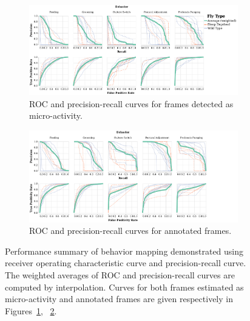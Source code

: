 \begin{figure}[htb!]
	\centering
	\begin{subfigure}[b]{0.99\linewidth}
		\centering\includegraphics[width=\linewidth]{figures/PRC_ROC-DActfiltered.pdf}
		\caption{ROC and precision-recall curves for frames detected as micro-activity. \label{figure:ROC-PRC-Act}}
	\end{subfigure}%

	\begin{subfigure}[b]{0.99\linewidth}
		\centering\includegraphics[width=\linewidth]{figures/PRC_ROC-DAnnfiltered.pdf}
		\caption{ROC and precision-recall curves for annotated frames. \label{figure:ROC-PRC-Ann}}
	\end{subfigure}%
	\caption[Performance summary of behavior mapping demonstrated using receiver operating characteristic curve and precision-recall curve.
	]{Performance summary of behavior mapping demonstrated using receiver operating characteristic curve and precision-recall curve.
		The weighted averages of ROC and precision-recall curves are computed by interpolation.
		Curves for both frames estimated as micro-activity and annotated frames are given respectively in Figures~\ref{figure:ROC-PRC-Act}, ~\ref{figure:ROC-PRC-Ann}. \label{figure:ROC-PRC}}
\end{figure}

